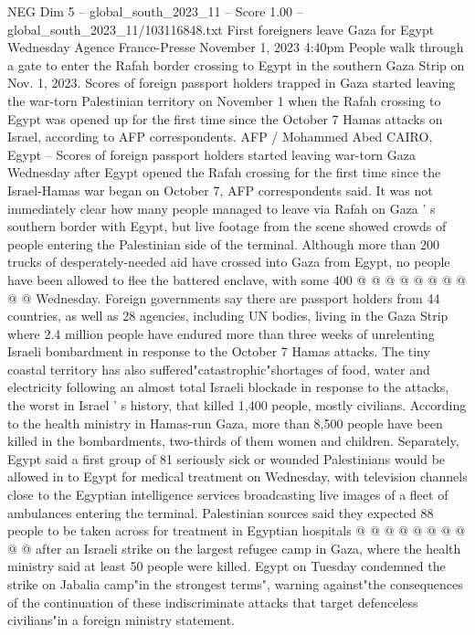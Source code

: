 \begin{textsample}{NEG Dim 5 – global\_south\_2023\_11 – Score 1.00 – global\_south\_2023\_11/103116848.txt}  \label{ex:f5_neg_178}
First foreigners leave Gaza for Egypt Wednesday Agence France-Presse November 1, 2023 4:40pm People walk through a gate to enter the Rafah border crossing to Egypt in the southern Gaza Strip on Nov. 1, 2023.
Scores of foreign passport holders trapped in Gaza started leaving the war-torn Palestinian territory on November 1 when the Rafah crossing to Egypt was opened up for the first time since the October 7 Hamas attacks on Israel, according to AFP correspondents.
AFP / Mohammed Abed CAIRO, Egypt -- Scores of foreign passport holders started leaving war-torn Gaza Wednesday after Egypt opened the Rafah crossing for the first time since the Israel-Hamas war began on October 7, AFP correspondents said.
It was not immediately clear how many people managed to leave via Rafah on Gaza ' s southern border with Egypt, but live footage from the scene showed crowds of people entering the Palestinian side of the terminal.
Although more than 200 trucks of desperately-needed aid have crossed into Gaza from Egypt, no people have been allowed to flee the battered enclave, with some 400 @ @ @ @ @ @ @ @ @ @ Wednesday.
Foreign governments say there are passport holders from 44 countries, as well as 28 agencies, including UN bodies, living in the Gaza Strip where 2.4 million people have endured more than three weeks of unrelenting Israeli bombardment in response to the October 7 Hamas attacks.
The tiny coastal territory has also suffered"catastrophic"shortages of food, water and electricity following an almost total Israeli blockade in response to the attacks, the worst in Israel ' s history, that killed 1,400 people, mostly civilians.
According to the health ministry in Hamas-run Gaza, more than 8,500 people have been killed in the bombardments, two-thirds of them women and children.
Separately, Egypt said a first group of 81 seriously sick or wounded Palestinians would be allowed in to Egypt for medical treatment on Wednesday, with television channels close to the Egyptian intelligence services broadcasting live images of a fleet of ambulances entering the terminal.
Palestinian sources said they expected 88 people to be taken across for treatment in Egyptian hospitals @ @ @ @ @ @ @ @ @ @ after an Israeli strike on the largest refugee camp in Gaza, where the health ministry said at least 50 people were killed.
Egypt on Tuesday condemned the strike on Jabalia camp"in the strongest terms", warning against"the consequences of the continuation of these indiscriminate attacks that target defenceless civilians"in a foreign ministry statement.

\end{textsample}
